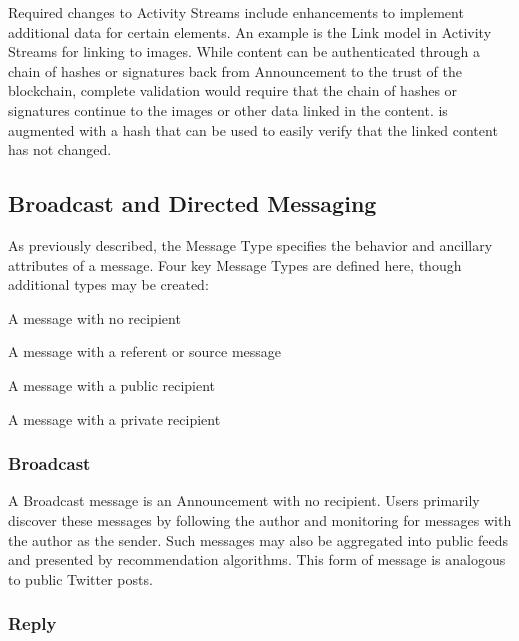\documentclass[12pt,letterpaper]{article}
\providecommand{\tightlist}{%
\setlength{\itemsep}{0pt}\setlength{\parskip}{0pt}}
\begin{document}
Required changes to Activity Streams include enhancements to implement additional data for
certain elements. An example is the Link model in Activity Streams for linking to images.
While content can be authenticated through a chain of hashes or signatures back from
Announcement to the trust of the blockchain, complete validation would require that the
chain of hashes or signatures continue to the images or other data linked in the content.
 is augmented with a hash that can be used to easily verify that the linked
content has not changed.

\subsection{Broadcast and Directed Messaging}\label{sec:broadcast_and_directed_messaging}

As previously described, the Message Type specifies the behavior and ancillary attributes
of a message. Four key Message Types are defined here, though additional types may be
created:

\begin{samepage}
	\begin{description}
		\tightlist
		\item[Broadcast:]
		      A message with no recipient
		\item[Reply:]
		      A message with a referent or source message
		\item[Direct:]
		      A message with a public recipient
		\item[Dead Drop:]
		      A message with a private recipient
	\end{description}
\end{samepage}

\subsubsection{Broadcast}

A Broadcast message is an Announcement with no recipient. Users primarily discover these
messages by following the author and monitoring for messages with the author as the
sender. Such messages may also be aggregated into public feeds and presented by
recommendation algorithms. This form of message is analogous to public Twitter posts.

\subsubsection{Reply}
\end{document}
